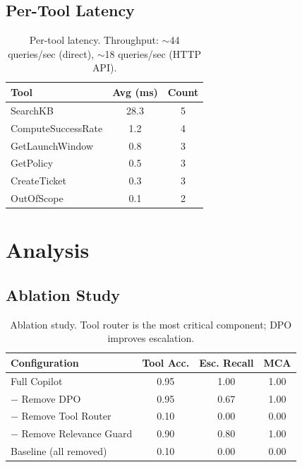 \documentclass{article}
\begin{document}
\subsection{Per-Tool Latency}

\begin{table}[h]
\centering
\begin{tabular}{@{}l c c@{}}
\toprule
\textbf{Tool} & \textbf{Avg (ms)} & \textbf{Count} \\
\midrule
SearchKB           & 28.3 & 5 \\
ComputeSuccessRate & 1.2  & 4 \\
GetLaunchWindow    & 0.8  & 3 \\
GetPolicy          & 0.5  & 3 \\
CreateTicket       & 0.3  & 3 \\
OutOfScope         & 0.1  & 2 \\
\bottomrule
\end{tabular}
\caption{Per-tool latency. Throughput: $\sim$44 queries/sec (direct), $\sim$18 queries/sec (HTTP API).}
\label{tab:latency}
\end{table}

\section{Analysis}

\subsection{Ablation Study}

\begin{table}[h]
\centering
\begin{tabular}{@{}l c c c@{}}
\toprule
\textbf{Configuration} & \textbf{Tool Acc.} & \textbf{Esc. Recall} & \textbf{MCA} \\
\midrule
Full Copilot             & 0.95 & 1.00 & 1.00 \\
$-$ Remove DPO           & 0.95 & 0.67 & 1.00 \\
$-$ Remove Tool Router   & 0.10 & 0.00 & 0.00 \\
$-$ Remove Relevance Guard & 0.90 & 0.80 & 1.00 \\
Baseline (all removed)   & 0.10 & 0.00 & 0.00 \\
\bottomrule
\end{tabular}
\caption{Ablation study. Tool router is the most critical component; DPO improves escalation.}
\label{tab:ablation}
\end{table}
\end{document}
